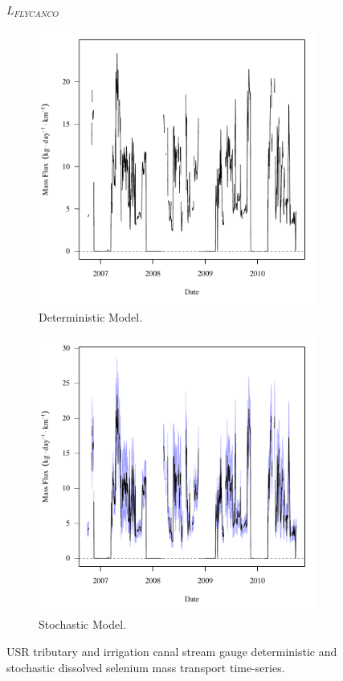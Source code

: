 \subfiguremid
\begin{landscape}
	\begin{figure}
		$ \displaystyle L_{FLYCANCO} $
		\begin{subfigure}{0.7\textwidth}
			\centering
			\includegraphics[width=\tableCustomSize]{"Figures/Results_USR/Deterministic/f FLY"}
			\caption{Deterministic Model.}
		\end{subfigure}%
		\begin{subfigure}{0.7\textwidth}
			\centering
			\includegraphics[width=\tableCustomSize]{"Figures/Results_USR/Stochastic/f FLY"}
			\caption{Stochastic Model.}
		\end{subfigure}
		\caption{USR tributary and irrigation canal stream gauge deterministic and stochastic dissolved selenium mass transport time-series.}
	\end{figure}
\end{landscape}
